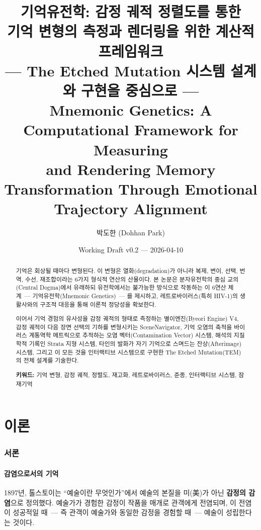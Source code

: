 \documentclass[11pt, a4paper]{article}
\title{%
  기억유전학: 감정 궤적 정렬도를 통한\\
  기억 변형의 측정과 렌더링을 위한 계산적 프레임워크\\[0.5em]
  \large --- The Etched Mutation 시스템 설계와 구현을 중심으로 ---\\[0.8em]
  \normalsize Mnemonic Genetics: A Computational Framework for Measuring\\
  and Rendering Memory Transformation Through Emotional Trajectory Alignment
}
\author{박도한 (Dohhan Park)}
\date{Working Draft v0.2 --- 2026-04-10}
\begin{document}
\maketitle

\begin{abstract}
기억은 회상될 때마다 변형된다. 이 변형은 열화(degradation)가 아니라 복제, 변이, 선택, 번역, 수선, 재조합이라는 6가지 형식적 연산의 산물이다. 본 논문은 분자유전학의 중심 교의(Central Dogma)에서 유래하되 유전학에서는 불가능한 방식으로 작동하는 이 6연산 체계~--- 기억유전학(Mnemonic Genetics)~--- 를 제시하고, 레트로바이러스(특히 HIV-1)의 생활사와의 구조적 대응을 통해 이론적 정당성을 확보한다.

이어서 기억 경험의 유사성을 감정 궤적의 형태로 측정하는 별이엔진(Byeori Engine) V4, 감정 궤적이 다음 장면 선택의 기하를 변형시키는 SceneNavigator, 기억 오염의 축적을 바이러스 계통역학 메트릭으로 추적하는 오염 벡터(Contamination Vector) 시스템, 해석의 지질학적 기록인 Strata 지형 시스템, 타인의 발화가 자기 기억으로 스며드는 잔상(Afterimage) 시스템, 그리고 이 모든 것을 인터랙티브 시스템으로 구현한 The Etched Mutation(TEM)의 전체 설계를 기술한다.

\medskip
\noindent\textbf{키워드:} 기억 변형, 감정 궤적, 정렬도, 재고화, 레트로바이러스, 준종, 인터랙티브 시스템, 잠재기억
\end{abstract}

\tableofcontents
\newpage



\part{이론}

\section{서론}

\subsection{감염으로서의 기억}

1897년, 톨스토이는 ``예술이란 무엇인가''에서 예술의 본질을 미(美)가 아닌 \textbf{감정의 감염}으로 정의했다\cite{tolstoy1897}. 예술가가 경험한 감정이 작품을 매개로 관객에게 전염되며, 이 전염이 성공적일 때~--- 즉 관객이 예술가와 동일한 감정을 경험할 때~--- 예술이 성립한다는 것이다.
\end{document}
